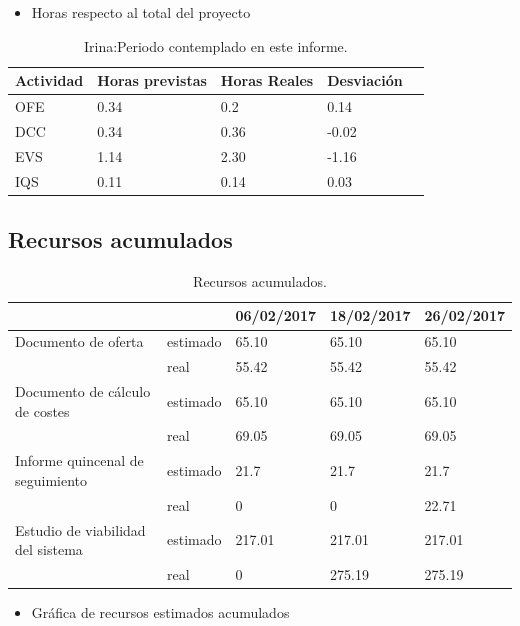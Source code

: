 \begin{itemize}
\item Horas respecto al total del proyecto
\end{itemize}
\begin{table}[H]
\begin{center}
\begin{tabular}{ l l l l l }
  Actividad & Horas previstas & Horas Reales & Desviación \\ \hline \hline
    OFE & 0.34 & 0.2 & 0.14\\ \hline
    DCC & 0.34 & 0.36 & -0.02 \\ \hline
    EVS & 1.14 & 2.30 & -1.16 \\ \hline
    IQS & 0.11 & 0.14 & 0.03 \\ \hline
\end{tabular}
\caption{Irina:Periodo contemplado en este informe.}
\label{tab:Irina:PeriodoContempladoInforme}
\end{center}
\end{table}

\subsection{Recursos acumulados}

\begin{table}[H]
\begin{center}
\begin{tabular}{ l | l | l |l | l }
\hline
	 &  & 06/02/2017 & 18/02/2017 & 26/02/2017 \\ \hline
	Documento de oferta & estimado & 65.10 & 65.10 & 65.10 \\
	 & real & 55.42 & 55.42 & 55.42 \\ \hline
	Documento de cálculo de costes & estimado & 65.10 & 65.10 & 65.10 \\
	 & real & 69.05 & 69.05 & 69.05 \\ \hline
	Informe quincenal de seguimiento & estimado & 21.7 & 21.7 & 21.7 \\
	 & real & 0 & 0 & 22.71 \\ \hline
	Estudio de viabilidad del sistema & estimado & 217.01 & 217.01 & 217.01 \\
	 & real & 0 & 275.19 & 275.19 \\ \hline
\end{tabular}
\caption{Recursos acumulados.}
\label{tab:Recursos acumulados}
\end{center}
\end{table}
\pagebreak
\begin{itemize}
\item Gráfica de recursos estimados acumulados
\end{itemize}


